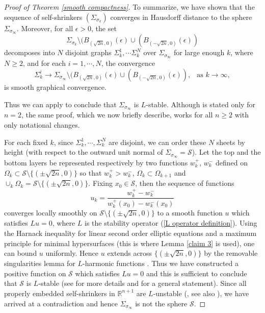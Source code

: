 \documentclass[12pt]{amsart}
\numberwithin{equation}{section}
\theoremstyle{remark}
\begin{document}
\begin{proof} [Proof of Theorem \ref{smooth compactness}]
		To summarize, we have shown that the sequence of self-shrinkers $(\Sigma_{\sigma_k})$ converges in Hausdorff distance to the sphere $\Sigma_{\sigma_\infty}$. Moreover, for all $\epsilon >0$, the set 
		$$\Sigma_{\sigma_k} \setminus (B_{(\sqrt{2n},0)}(\epsilon ) \cup  (B_{(-\sqrt{2n},0)}(\epsilon ))$$ decomposes into $N$ disjoint graphs $\Sigma^1_k,\cdots \Sigma^N_k$ over $\Sigma_{\sigma_\infty}$ for large enough $k$, where $N\ge 2$, and for each $i=1, \cdots, N$, the convergence 
		$$\Sigma^i_k \to \Sigma_{\sigma_\infty}\setminus (B_{(\sqrt{2n},0)}(\epsilon ) \cup  (B_{(-\sqrt{2n},0)}(\epsilon )), \ \ \text{ as } k\to \infty,$$
		is smooth graphical convergence.
		
		Thus we can apply \cite[Proposition 3.2]{CM2} to conclude that $\Sigma_{\sigma_\infty}$ is $L$-stable. Although \cite[Proposition 3.2]{CM2} is stated only for $n=2$, the same proof, which we now briefly describe, works for all $n\ge 2$ with only notational changes. 
		
		For each fixed $k$, since $\Sigma_k^1, \cdots, \Sigma_k^N$ are disjoint, we can order these $N$ sheets by height (with respect to the outward unit normal of $\Sigma_{\sigma_\infty}= \mathcal S$). Let the top and the bottom layers be represented respectively by two functions $w_k^+$, $w_k^-$ defined on $\Omega_k \subset \mathcal S\setminus \{(\pm \sqrt{2n},0)\}$ so that $w_k^+ > w_k^-$, $\Omega_k \subset \Omega_{k+1}$ and $\cup_k \Omega_k = \mathcal S \setminus \{(\pm \sqrt{2n},0)\}$. Fixing $x_0\in \mathcal S$, then the sequence of functions 
		$$ u_k = \frac{w^+_k - w_k^-}{w_k^+(x_0) - w_k^-(x_0)}$$
		converges locally smoothly on $\mathcal S \setminus \{(\pm \sqrt{2n},0)\}$ to a smooth function $u$ which satisfies $Lu=0$, where $L$ is the stability operator (\ref{L operator definition}). Using the Harnack inequality for linear second order elliptic equations and a maximum principle for minimal hypersurfaces (this is where Lemma \ref{claim 3} is used), one can bound $u$ uniformly. Hence $u$ extends across $\{(\pm \sqrt{2n},0)\}$ by the removable singularities lemma for $L$-harmonic functions \cite{Serrin}. Thus we have constructed a positive function on $\mathcal S$ which satisfies $Lu=0$ and this is sufficient to conclude that $\mathcal S$ is $L$-stable (see \cite{CM2} for more details and \cite{FCS} for a general statement). Since all properly embedded self-shrinkers in $\mathbb R^{n+1}$ are $L$-unstable (\cite{CM1}, see also \cite[Theorem 0.5]{CM2}), we have arrived at a contradiction and hence $\Sigma_{\sigma_\infty}$ is not the sphere $\mathcal S$. 
		

\end{proof}
\end{document}
